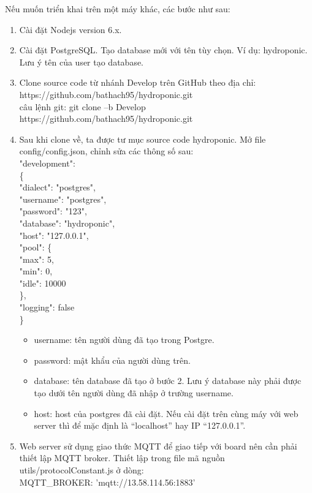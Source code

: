 \documentclass[a4paper,12pt,oneside]{article}
\begin{document}
\noindent Nếu muốn triển khai trên một máy khác, các bước như sau:
	\begin{enumerate}
	\item Cài đặt Nodejs version 6.x.
	\item Cài đặt PostgreSQL. Tạo database mới với tên tùy chọn. Ví dụ: hydroponic. Lưu ý tên
của user tạo database.
	\item Clone source code từ nhánh Develop trên GitHub theo địa chỉ:\\
https://github.com/bathach95/hydroponic.git \\
câu lệnh git: git clone –b Develop https://github.com/bathach95/hydroponic.git
	\item Sau khi clone về, ta được tư mục source code hydroponic. Mở file config/config.json,
chỉnh sửa các thông số sau: \\
"development":\\
\{\\
"dialect": "postgres",\\
"username": "postgres",\\
"password": "123",\\
"database": "hydroponic",\\
"host": "127.0.0.1",\\
"pool": \{\\
"max": 5,\\
"min": 0,\\
"idle": 10000\\
\},\\
"logging": false\\
\} 
	\begin{itemize}
	\item username: tên người dùng đã tạo trong Postgre.
	\item password: mật khẩu của người dùng trên.
	\item database: tên database đã tạo ở bước 2. Lưu ý database này phải được tạo dưới
tên người dùng đã nhập ở trường username.
	\item host: host của postgres đã cài đặt. Nếu cài đặt trên cùng máy với web server thì để
mặc định là “localhost” hay IP “127.0.0.1”.
	\end{itemize}
	
	\item Web server sử dụng giao thức MQTT để giao tiếp với board nên cần phải thiết lập
MQTT broker. Thiết lập trong file mã nguồn utils/protocolConstant.js ở dòng: \\
MQTT\_BROKER: 'mqtt://13.58.114.56:1883'
	

\end{enumerate}
\end{document}
